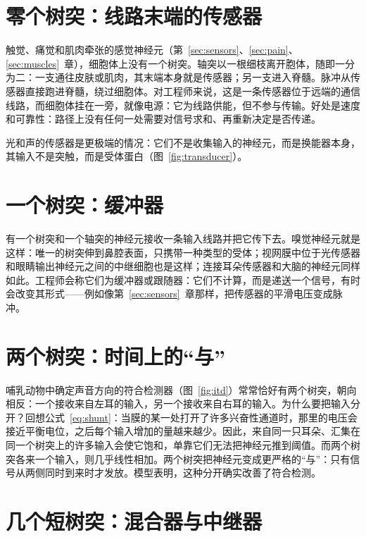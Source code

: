 \section{零个树突：线路末端的传感器}

触觉、痛觉和肌肉牵张的感觉神经元（第~\ref{sec:sensors}、\ref{sec:pain}、\ref{sec:muscles}~章），细胞体上没有一个树突。轴突以一根细枝离开胞体，随即一分为二：一支通往皮肤或肌肉，其末端本身就是传感器；另一支进入脊髓。脉冲从传感器直接跑进脊髓，绕过细胞体。对工程师来说，这是一条传感器位于远端的通信线路，而细胞体挂在一旁，就像电源：它为线路供能，但不参与传输。好处是速度和可靠性：路径上没有任何一处需要对信号求和、再重新决定是否传递。

光和声的传感器是更极端的情况：它们不是收集输入的神经元，而是换能器本身，其输入不是突触，而是受体蛋白（图~\ref{fig:transducer}）。

\section{一个树突：缓冲器}

有一个树突和一个轴突的神经元接收一条输入线路并把它传下去。嗅觉神经元就是这样：唯一的树突伸到鼻腔表面，只携带一种类型的受体\cite{Mombaerts2004}；视网膜中位于光传感器和眼睛输出神经元之间的中继细胞也是这样；连接耳朵传感器和大脑的神经元同样如此。工程师会称它们为缓冲器或跟随器：它们不计算，而是递送一个信号，有时会改变其形式——例如像第~\ref{sec:sensors}~章那样，把传感器的平滑电压变成脉冲。

\section{两个树突：时间上的“与”}

哺乳动物中确定声音方向的符合检测器（图~\ref{fig:itd}）常常恰好有两个树突，朝向相反：一个接收来自左耳的输入，另一个接收来自右耳的输入\cite{Grothe2010}。为什么要把输入分开？回想公式~\eqref{eq:shunt}：当膜的某一处打开了许多兴奋性通道时，那里的电压会接近平衡电位，之后每个输入增加的量越来越少。因此，来自同一只耳朵、汇集在同一个树突上的许多输入会使它饱和，单靠它们无法把神经元推到阈值。而两个树突各来一个输入，则几乎线性相加。两个树突把神经元变成更严格的“与”：只有信号从两侧同时到来时才发放。模型表明，这种分开确实改善了符合检测\cite{AgmonSnir1998}。

\section{几个短树突：混合器与中继器}

